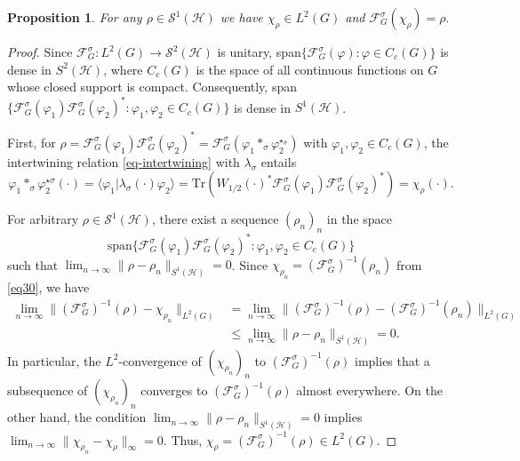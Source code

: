 \documentclass[12pt,reqno]{amsart}
\newtheorem{prop}[thm]{Proposition}
\theoremstyle{definition}
\theoremstyle{definition}
\theoremstyle{definition}
\numberwithin{thm}{section}
\numberwithin{equation}{section}
\newcommand{\la}{\langle}
\newcommand{\ra}{\rangle}
\newcommand{\F}{\mathcal{F}}
\newcommand{\Hi}{\mathcal{H}}
\newcommand{\mc}[1]{\mathcal #1}
\newcommand{\lm}{\lambda}
\begin{document}
\begin{prop}\label{prop-Fourier-char}
For any $\rho \in \mc S^1(\Hi)$ we have $\chi_\rho \in L^2(G)$ and $\F^\sigma_G(\chi_\rho) = \rho.$
\end{prop}
\begin{proof}
Since $\F^\sigma_G: L^2(G) \to \mc S^2(\Hi)$ is unitary, span$\{\F^\sigma_G(\varphi): \varphi \in C_c(G)\}$ is dense in $S^2(\Hi)$, where $C_c(G)$ is the space of all continuous functions on $G$ whose closed support is compact. Consequently, span$\{\F^\sigma_G(\varphi_1)\F^\sigma_G(\varphi_2)^*: \varphi_1, \varphi_2 \in C_c(G)\}$ is dense in $S^1(\Hi)$. 

First, for $\rho = \F^\sigma_G(\varphi_1)\F^\sigma_G(\varphi_2)^* = \F^\sigma_G(\varphi_1 *_\sigma \varphi^{\star_\sigma}_2)$ with $\varphi_1, \varphi_2 \in C_c(G)$, the intertwining relation \eqref{eq-intertwining} with $\lm_\sigma$ entails
    \begin{equation}\label{eq30}
        \varphi_1 *_\sigma \varphi^{\star \sigma}_2(\cdot) = \la \varphi_1 | \lambda_\sigma(\cdot)\varphi_2\ra = \textrm{Tr}(W_{1/2}(\cdot)^*\F^\sigma_G(\varphi_1)\F^\sigma_G(\varphi_2)^*) = \chi_\rho(\cdot).
    \end{equation}

For arbitrary $\rho \in \mc S^1(\Hi)$, there exist a sequence $(\rho_n)_n$ in the space 
    $$\text{span}\{\F^\sigma_G(\varphi_1)\F^\sigma_G(\varphi_2)^*: \varphi_1, \varphi_2 \in C_c(G)\}$$
such that $\displaystyle \lim_{n\rightarrow \infty}\|\rho-\rho_n\|_{S^1(\Hi)}=0$. Since $\chi_{\rho_n}=(\F^\sigma_G)^{-1}(\rho_n)$ from \eqref{eq30}, we have
\begin{align*}
    \lim_{n\rightarrow \infty}\|(\F^\sigma_G)^{-1}(\rho)-\chi_{\rho_n}\|_{L^2(G)}&=\lim_{n\rightarrow \infty}\|(\F^\sigma_G)^{-1}(\rho)-(\F^\sigma_G)^{-1}(\rho_n)\|_{L^2(G)}\\
    & \leq \lim_{n\rightarrow \infty}\|\rho-\rho_n\|_{S^1(\Hi)}=0.
\end{align*}
In particular, the $L^2$-convergence of $(\chi_{\rho_n})_n$ to $(\F^\sigma_G)^{-1}(\rho)$ implies that a subsequence of $(\chi_{\rho_n})_n$ converges to $(\F^\sigma_G)^{-1}(\rho)$ almost everywhere. On the other hand, the condition $\displaystyle \lim_{n\rightarrow \infty}\|\rho-\rho_n\|_{S^1(\Hi)}=0$ implies $\displaystyle \lim_{n\rightarrow \infty}\|\chi_{\rho_n}-\chi_\rho\|_{\infty}=0$. Thus, $\chi_{\rho}=(\F^\sigma_G)^{-1}(\rho)\in L^2(G)$. 
\end{proof}
\end{document}
